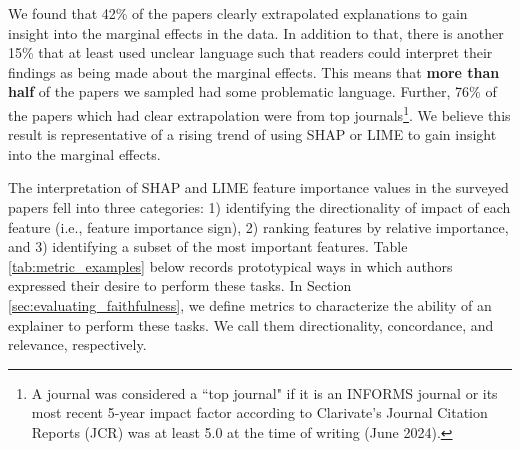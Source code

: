 \documentclass[mnsc,blindrev]{informs3}
\begin{document}
        We found that 42\% of the papers clearly extrapolated explanations to gain insight into the marginal effects in the data. In addition to that, there is another 15\% that at least used unclear language such that readers could interpret their findings as being made about the marginal effects. This means that \textbf{more than half} of the papers we sampled had some problematic language. Further, 76\% of the papers which had clear extrapolation were from top journals\footnote{A journal was considered a ``top journal" if it is an INFORMS journal or its most recent 5-year impact factor according to Clarivate's Journal Citation Reports (JCR) was at least 5.0 at the time of writing (June 2024).}.
        We believe this result is representative of a rising trend of using SHAP or LIME to gain insight into the marginal effects.

        The interpretation of SHAP and LIME feature importance values in the surveyed  papers fell into three categories: 1) identifying the directionality of impact of each feature (i.e., feature importance sign), 2) ranking features by relative importance, and 3) identifying a subset of the most important features. Table \ref{tab:metric_examples} below records prototypical ways in which authors expressed their desire to perform these tasks. In Section \ref{sec:evaluating_faithfulness}, we define metrics to characterize the ability of an explainer to perform these tasks. We call them directionality, concordance, and relevance, respectively. 
\end{document}
